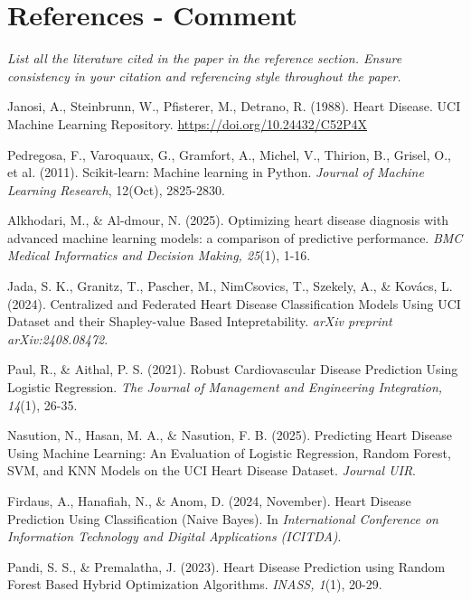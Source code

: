 \documentclass{article}
\begin{document}
\section*{References - Comment}
\textit{List all the literature cited in the paper in the reference section. Ensure consistency in your citation and referencing style throughout the paper.}

\begin{thebibliography}{99}

    Janosi, A., Steinbrunn, W., Pfisterer, M., Detrano, R. (1988). Heart Disease. UCI Machine Learning Repository. \url{https://doi.org/10.24432/C52P4X}

    Pedregosa, F., Varoquaux, G., Gramfort, A., Michel, V., Thirion, B., Grisel, O., et al. (2011). Scikit-learn: Machine learning in Python. \textit{Journal of Machine Learning Research}, 12(Oct), 2825-2830.

    Alkhodari, M., \& Al-dmour, N. (2025). Optimizing heart disease diagnosis with advanced machine learning models: a comparison of predictive performance. \textit{BMC Medical Informatics and Decision Making, 25}(1), 1-16.

    Jada, S. K., Granitz, T., Pascher, M., NimCsovics, T., Szekely, A., \& Kovács, L. (2024). Centralized and Federated Heart Disease Classification Models Using UCI Dataset and their Shapley-value Based Intepretability. \textit{arXiv preprint arXiv:2408.08472}.

    Paul, R., \& Aithal, P. S. (2021). Robust Cardiovascular Disease Prediction Using Logistic Regression. \textit{The Journal of Management and Engineering Integration, 14}(1), 26-35.

    Nasution, N., Hasan, M. A., \& Nasution, F. B. (2025). Predicting Heart Disease Using Machine Learning: An Evaluation of Logistic Regression, Random Forest, SVM, and KNN Models on the UCI Heart Disease Dataset. \textit{Journal UIR}.

    Firdaus, A., Hanafiah, N., \& Anom, D. (2024, November). Heart Disease Prediction Using Classification (Naive Bayes). In \textit{International Conference on Information Technology and Digital Applications (ICITDA)}.

    Pandi, S. S., \& Premalatha, J. (2023). Heart Disease Prediction using Random Forest Based Hybrid Optimization Algorithms. \textit{INASS, 1}(1), 20-29.


\end{thebibliography}
\end{document}

